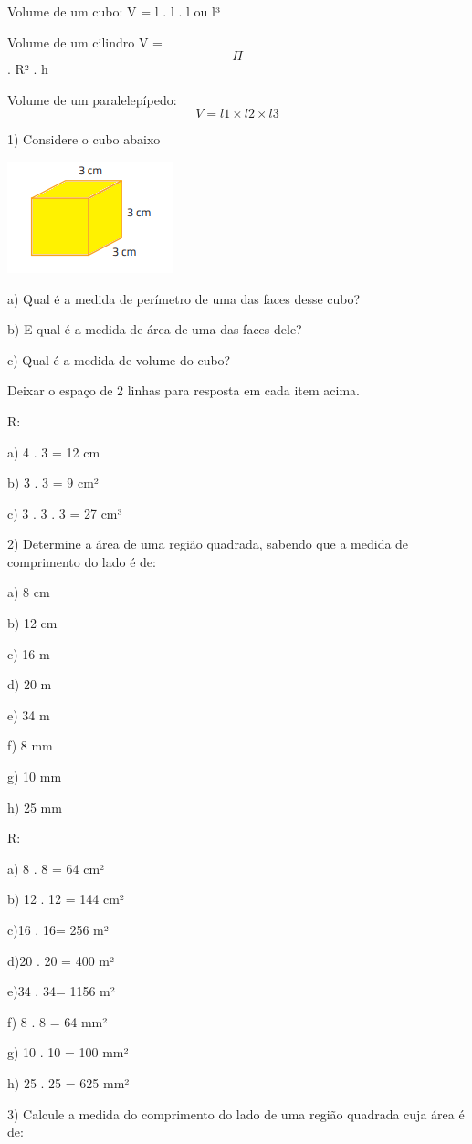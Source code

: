 Volume de um cubo: V = l . l . l ou l³

Volume de um cilindro V = \[\Pi\] . R² . h

Volume de um paralelepípedo: \[V = l1 \times l2 \times l3\]


1) Considere o cubo abaixo

\includegraphics[width=1.89583in,height=1.27083in]{./imgSAEB_8_MAT/media/image42.png}

a) Qual é a medida de perímetro de uma das faces desse cubo?

b) E qual é a medida de área de uma das faces dele?

c) Qual é a medida de volume do cubo?

Deixar o espaço de 2 linhas para resposta em cada item acima.

R:

a) 4 . 3 = 12 cm

b) 3 . 3 = 9 cm²

c) 3 . 3 . 3 = 27 cm³

2) Determine a área de uma região quadrada, sabendo que a medida de
comprimento do lado é de:

a) 8 cm

b) 12 cm

c) 16 m

d) 20 m

e) 34 m

f) 8 mm

g) 10 mm

h) 25 mm

R:

a) 8 . 8 = 64 cm²

b) 12 . 12 = 144 cm²

c)16 . 16= 256 m²

d)20 . 20 = 400 m²

e)34 . 34= 1156 m²

f) 8 . 8 = 64 mm²

g) 10 . 10 = 100 mm²

h) 25 . 25 = 625 mm²

3) Calcule a medida do comprimento do lado de uma região quadrada cuja
área é de:

